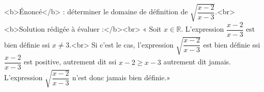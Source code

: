 <b>Énoncé</b> : déterminer le domaine de définition de $\sqrt{\dfrac{x-2}{x-3}}$.<br> <b>Solution rédigée à évaluer :</b><br>  « Soit $x\in\mathbb{R}$. L'expression $\dfrac{x-2}{x-3}$ est bien définie ssi $x\neq 3$.<br> Si c'est le cas, l'expression $\sqrt{\dfrac{x-2}{x-3}}$ est bien définie ssi $\dfrac{x-2}{x-3}$ est positive, autrement dit ssi $x-2\geq x-3$ autrement dit jamais. L'expression $\sqrt{\dfrac{x-2}{x-3}}$ n'est donc jamais bien définie.»

\begin{reponses}
\end{reponses}

\begin{comment}
Confusion entre $\geq 0$ et $\geq 1$ mais même là le reste est incorrect.
\end{comment}

